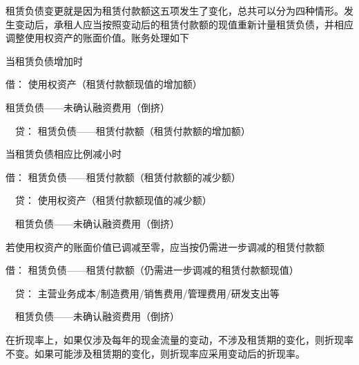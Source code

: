 \documentclass[UTF8,12pt]{ctexart}
\newenvironment{Dr}{\noindent 借：}{\par}
\newenvironment{Cr}{\noindent \ \ 贷：}{\par}
\numberwithin{equation}{section} %
\numberwithin{figure}{section}
\numberwithin{table}{section}
\begin{document}
	租赁负债变更就是因为租赁付款额这五项发生了变化，总共可以分为四种情形。发生变动后，承租人应当按照变动后的租赁付款额的现值重新计量租赁负债，并相应调整使用权资产的账面价值。账务处理如下
	
	当租赁负债增加时
	
	\begin{Dr}
		使用权资产（租赁付款额现值的增加额） 
		
		租赁负债——未确认融资费用（倒挤）
	\end{Dr}
	\begin{Cr}
		租赁负债——租赁付款额（租赁付款额的增加额）
	\end{Cr}

	当租赁负债相应比例减小时
	
	\begin{Dr}
		租赁负债——租赁付款额（租赁付款额的减少额）
	\end{Dr}
	\begin{Cr}
		使用权资产（租赁付款额现值的减少额） 
		
		\ \ 租赁负债——未确认融资费用（倒挤）
	\end{Cr}

	若使用权资产的账面价值已调减至零，应当按仍需进一步调减的租赁付款额
	
	\begin{Dr}
		租赁负债——租赁付款额（仍需进一步调减的租赁付款额现值）
	\end{Dr}
	\begin{Cr}
		主营业务成本/制造费用/销售费用/管理费用/研发支出等
		
		\ \ 租赁负债——未确认融资费用（倒挤）
	\end{Cr}
	
	在折现率上，如果仅涉及每年的现金流量的变动，不涉及租赁期的变化，则折现率不变。如果可能涉及租赁期的变化，则折现率应采用变动后的折现率。
\end{document}
